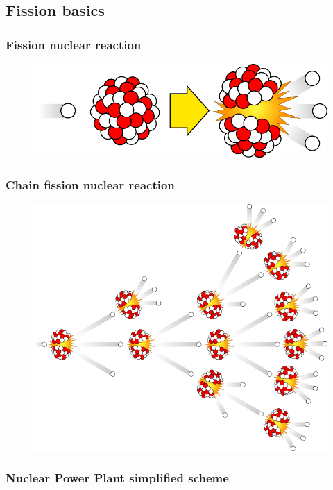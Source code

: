 \subsection{Fission basics}
\begin{frame}
  \frametitle{Fission nuclear reaction}
               \begin{figure}[t]
                \vspace*{-0.1in}
			\hspace*{-0.35in}
                \includegraphics[height=0.25\textwidth]{./images/800px-Fission.png}
               \end{figure}            
\end{frame}

\begin{frame}
  \frametitle{Chain fission nuclear reaction}
               \begin{figure}[t]
                \vspace*{-0.1in}
			\hspace*{-0.35in}
                \includegraphics[height=0.7\textwidth]{./images/715px-Chainreaction.png}
               \end{figure}            
\end{frame}

\begin{frame}
  \frametitle{Nuclear Power Plant simplified scheme}
\end{frame}

